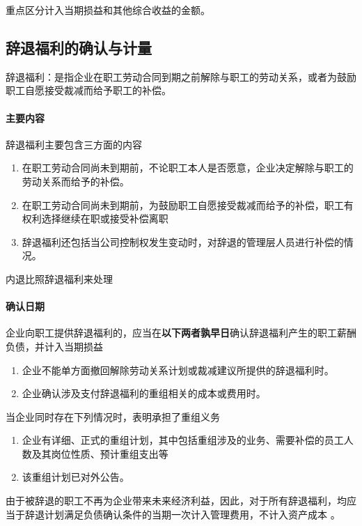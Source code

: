 \documentclass[UTF8,12pt]{ctexart}
\numberwithin{equation}{section} %
\numberwithin{figure}{section}
\numberwithin{table}{section}
\begin{document}
	重点区分计入当期损益和其他综合收益的金额。
	
	\subsection{辞退福利的确认与计量}
	辞退福利：是指企业在职工劳动合同到期之前解除与职工的劳动关系，或者为鼓励职工自愿接受裁减而给予职工的补偿。	
	
	\paragraph{主要内容}辞退福利主要包含三方面的内容
	\begin{enumerate}
		\item 在职工劳动合同尚未到期前，不论职工本人是否愿意，企业决定解除与职工的劳动关系而给予的补偿。
		
		\item 在职工劳动合同尚未到期前，为鼓励职工自愿接受裁减而给予的补偿，职工有权利选择继续在职或接受补偿离职
		
		\item 辞退福利还包括当公司控制权发生变动时，对辞退的管理层人员进行补偿的情况。
	\end{enumerate}

	内退比照辞退福利来处理

	\paragraph{确认日期}企业向职工提供辞退福利的，应当在\textbf{以下两者孰早日}确认辞退福利产生的职工薪酬负债，并计入当期损益
	\begin{enumerate}
		\item 企业不能单方面撤回解除劳动关系计划或裁减建议所提供的辞退福利时。
		
		\item 企业确认涉及支付辞退福利的重组相关的成本或费用时。
	\end{enumerate}

	当企业同时存在下列情况时，表明承担了重组义务
	\begin{enumerate}
		\item 企业有详细、正式的重组计划，其中包括重组涉及的业务、需要补偿的员工人数及其岗位性质、预计重组支出等

		\item 该重组计划已对外公告。
	\end{enumerate}

	由于被辞退的职工不再为企业带来未来经济利益，因此，对于所有辞退福利，均应当于辞退计划满足负债确认条件的当期一次计入管理费用，不计入资产成本 。
	
\end{document}

